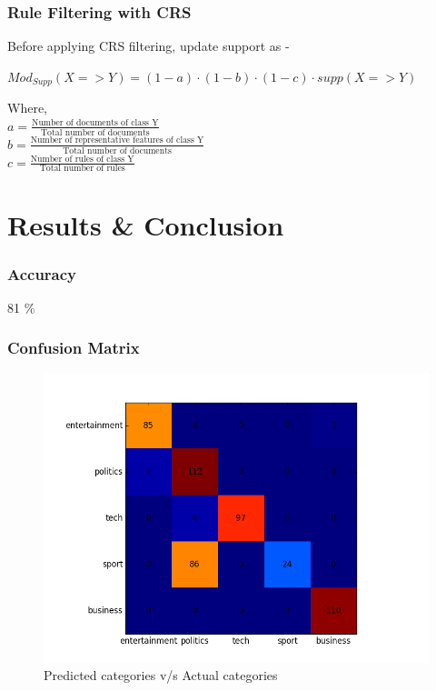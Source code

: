 \documentclass{beamer}
\begin{document}
		\begin{frame}
			\frametitle{Rule Filtering with CRS}
			Before applying CRS filtering, update support as -
			\begin{center}
			$ Mod_{Supp}(X=>Y) = (1-a)\cdot(1-b)\cdot(1-c)\cdot supp(X=>Y) $
			\end{center}
			
			Where, \\
			$a = \frac{\text{Number of documents of class Y}}{\text{Total number of documents}}$ \\ \smallskip
			$b = \frac{\text{Number of representative features of class Y}}{\text{Total number of documents}}$ \\ \smallskip
			$c = \frac{\text{Number of rules of class Y}}{\text{Total number of rules}}$
			
		    		
		\end{frame}
		

		
	\section{Results \& Conclusion}
	\begin{frame}
			\frametitle{Accuracy}
			\begin{center}
				\huge{ 81 \% }
			\end{center}
	\end{frame}
	
	\begin{frame}
	
			\frametitle{Confusion Matrix}
			
			\begin{figure}
				\includegraphics[scale=.4]{conf3.png}
				\caption{Predicted categories v/s Actual categories}
			\end{figure}
			
	\end{frame}
	
\end{document}
